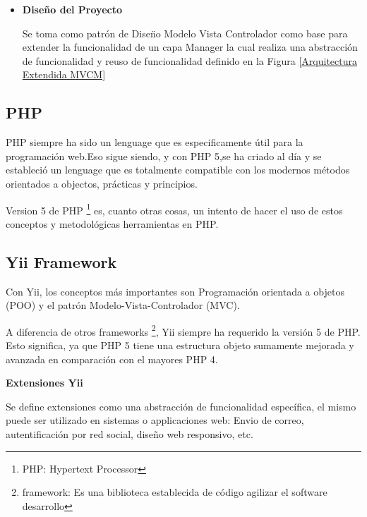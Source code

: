 \begin{itemize}

\item \textbf{Dise\~{n}o del Proyecto}

Se toma como patr\'{o}n de Dise\"{n}o Modelo Vista Controlador como base para 
extender la funcionalidad de un capa Manager la cual realiza una abstracci\'{o}n
de funcionalidad y reuso de funcionalidad definido en la Figura \ref{Arquitectura Extendida MVCM}

\begin{minipage}{1.0\textwidth}
	\centering
	\label{Arquitectura Extendida MVCM}
\end{minipage}


\end{itemize}

\subsection{PHP}

PHP siempre ha sido un lenguage que es especificamente \'{u}til para la programaci\'{o}n
web.Eso sigue siendo, y con PHP 5,se ha criado al d\'{i}a y se estableci\'{o} un lenguage
que es totalmente compatible con los modernos m\'{e}todos orientados a objectos, 
pr\'{a}cticas y principios. 

Version 5 de PHP \footnote{PHP: Hypertext Processor} es, cuanto otras cosas, un intento
de hacer el uso de estos conceptos y metodol\'{o}gicas herramientas en PHP.\cite{reiersol2007php}

\subsection{Yii Framework}

Con Yii, los conceptos m\'{a}s importantes son Programaci\'{o}n orientada a objetos
(POO) y el patr\'{o}n Modelo-Vista-Controlador (MVC).

A diferencia de otros frameworks \footnote{framework: Es una biblioteca establecida
de c\'{o}digo agilizar el software desarrollo}, Yii siempre ha requerido la 
versi\'{o}n 5 de PHP. Esto significa, ya que PHP 5 tiene una estructura objeto sumamente mejorada y
avanzada en comparaci\'{o}n con el mayores PHP 4. \cite{ullman2013yii}

\textbf{Extensiones Yii}

Se define extensiones como una abstracci\'{o}n de funcionalidad espec\'{i}fica, el
mismo puede ser utilizado en sistemas o applicaciones web: Envio de correo, 
autentificaci\'{o}n por red social, dise\~{n}o web responsivo, etc.

